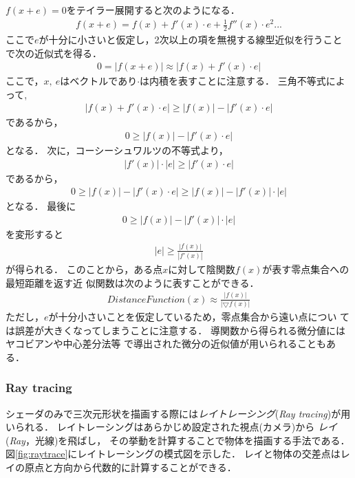 $f(x + e) = 0$をテイラー展開すると次のようになる．
\begin{align*}
f(x + e) = f(x) + f'(x) \cdot e  + \frac{1}{2}f''(x) \cdot e^2 ...
\end{align*}
ここで$e$が十分に小さいと仮定し，2次以上の項を無視する線型近似を行うこと
で次の近似式を得る．
\begin{align*}
0=|f(x + e)| \approx |f(x) + f'(x) \cdot e|
\end{align*}
ここで，$x,~e$はベクトルであり$\cdot$は内積を表すことに注意する．
三角不等式によって,
\begin{align*}
| f(x) + f'(x) \cdot e| \geq |f(x)| - |f'(x) \cdot e|
\end{align*}
であるから，
\begin{align*}
0 \geq |f(x)| - |f'(x) \cdot e|
\end{align*}
となる．
次に，コーシーシュワルツの不等式より，
\begin{align*}
 |f'(x)| \cdot |e| \geq | f'(x)\cdot e|
\end{align*}
であるから，
\begin{align*}
 0 \geq |f(x)| - |f'(x) \cdot e| \geq |f(x)| - |f'(x)| \cdot |e|
\end{align*}
となる．
最後に
\begin{align*}
0 \geq |f(x)| - |f'(x)| \cdot |e|
\end{align*}
を変形すると
\begin{align*}
|e| \geq \frac{|f(x)|}{|f'(x)|}
\end{align*}
が得られる．
このことから，ある点$x$に対して陰関数$f(x)$が表す零点集合への最短距離を返す近
似関数は次のように表すことができる．
\begin{align*}
 DistanceFunction(x) \approx \frac{|f(x)|}{|\bigtriangledown f(x)|}
\end{align*}
ただし，$e$が十分小さいことを仮定しているため，零点集合から遠い点につい
ては誤差が大きくなってしまうことに注意する．
導関数から得られる微分値にはヤコビアンや中心差分法等
で導出された微分の近似値が用いられることもある．

\subsubsection{Ray tracing}

シェーダのみで三次元形状を描画する際には\emph{レイトレーシング}({\it Ray
tracing})が用いられる．
レイトレーシングはあらかじめ設定された視点(カメラ)から
\emph{レイ}({\it Ray}，光線)を飛ばし，
その挙動を計算することで物体を描画する手法である．
図\ref{fig:raytrace}にレイトレーシングの模式図を示した．
レイと物体の交差点はレイの原点と方向から代数的に計算することができる．

